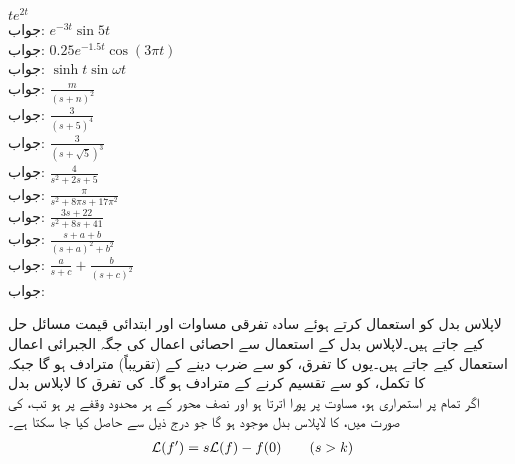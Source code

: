 \quad
$te^{2t}$\\
جواب:
\quad
$e^{-3t}\sin 5t$\\
جواب:
\quad
$0.25e^{-1.5t}\cos (3\pi t)$\\
جواب:
\quad
$\sinh t \sin \omega t$\\
جواب:
\quad
$\frac{m}{(s+n)^2}$\\
جواب:
\quad
$\frac{3}{(s+5)^4}$\\
جواب:
\quad
$\tfrac{3}{(s+\sqrt{5})^3}$\\
جواب:
\quad
$\tfrac{4}{s^2+2s+5}$\\
جواب:
\quad
$\frac{\pi}{s^2+8\pi s+17\pi^2}$\\
جواب:
\quad
$\frac{3s+22}{s^2+8s+41}$\\
جواب:
\quad
$\frac{s+a+b}{(s+a)^2+b^2}$\\
جواب:
\quad
$\frac{a}{s+c}+\frac{b}{(s+c)^2}$\\
جواب:

لاپلاس بدل کو استعمال کرتے ہوئے سادہ تفرقی مساوات اور ابتدائی قیمت مسائل حل کیے جاتے ہیں۔لاپلاس بدل کے استعمال سے  احصائی اعمال کی جگہ الجبرائی اعمال استعمال کیے جاتے ہیں۔یوں  کا تفرق،  کو  سے ضرب دینے کے (تقریباً) مترادف ہو گا جبکہ  کا تکمل،   کو  سے تقسیم کرنے کے مترادف ہو گا۔ 
\quad {} کی تفرق کا لاپلاس بدل\\
اگر  تمام  پر استمراری ہو، مساوت  پر پورا اترتا ہو اور  نصف محور  کے ہر محدود وقفے پر  ہو تب،  کی صورت میں،  کا لاپلاس بدل موجود ہو گا جو درج ذیل سے حاصل کیا جا سکتا ہے۔
\begin{align} \label{مساوات_لاپلاس_درجہ_اول_تفرق}
\mathcal{L}(f')&=s\mathcal{L}(f)-f(0)\quad \quad (s>k)
\end{align}

